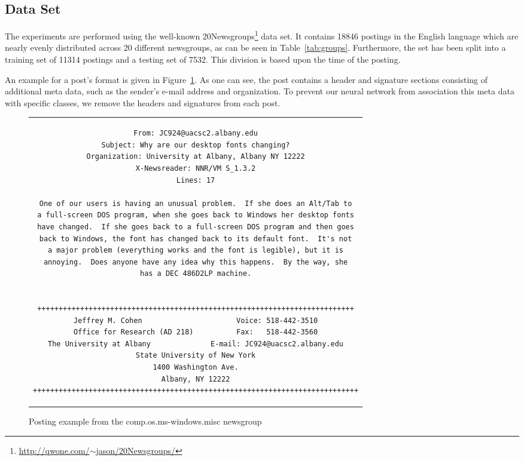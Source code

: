 \documentclass[sigconf]{acmart}
\begin{document}
\subsection{Data Set}

The experiments are performed using the well-known 20Newsgroups\footnote{\href{http://qwone.com/~jason/20Newsgroups/}{http://qwone.com/$\sim$jason/20Newsgroups/}} data set. It contains 18846 postings in the English language which are nearly evenly distributed across 20 different newsgroups, as can be seen in Table~\ref{tab:groups}. Furthermore, the set has been split into a training set of 11314 postings and a testing set of 7532. This division is based upon the time of the posting\cite{sklearn-newsgroup}.

An example for a post's format is given in Figure~\ref{fig:post}. As one can see, the post contains a header and signature sections consisting of additional meta data, such as the sender's e-mail address and organization. To prevent our neural network from association this meta data with specific classes, we remove the headers and signatures from each post.

\begin{figure}
	\label{fig:post}
	\begin{center}
		\begin{tabular}{c}
			\begin{lstlisting}[basicstyle=\footnotesize]
From: JC924@uacsc2.albany.edu
Subject: Why are our desktop fonts changing?
Organization: University at Albany, Albany NY 12222
X-Newsreader: NNR/VM S_1.3.2
Lines: 17

One of our users is having an unusual problem.  If she does an Alt/Tab to
a full-screen DOS program, when she goes back to Windows her desktop fonts
have changed.  If she goes back to a full-screen DOS program and then goes
back to Windows, the font has changed back to its default font.  It's not
a major problem (everything works and the font is legible), but it is
annoying.  Does anyone have any idea why this happens.  By the way, she
has a DEC 486D2LP machine.


++++++++++++++++++++++++++++++++++++++++++++++++++++++++++++++++++++++++++
Jeffrey M. Cohen                      Voice: 518-442-3510
Office for Research (AD 218)          Fax:   518-442-3560
The University at Albany              E-mail: JC924@uacsc2.albany.edu
State University of New York
1400 Washington Ave.
Albany, NY 12222
++++++++++++++++++++++++++++++++++++++++++++++++++++++++++++++++++++++++++++
			\end{lstlisting}
		\end{tabular}
	\end{center}
	\caption{Posting example from the comp.os.ms-windows.misc newsgroup}
\end{figure}
\end{document}

